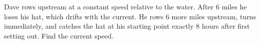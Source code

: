 Dave rows upstream at a constant speed relative to the water. After $6$ miles he loses his hat, which drifts with the current. He rows $6$ more miles upstream, turns immediately, and catches the hat at his starting point exactly $8$ hours after first setting out. Find the current speed.

